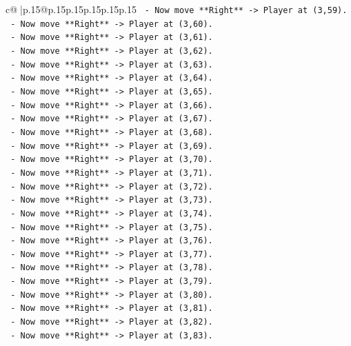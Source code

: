 \documentclass{article}
\begin{document}
{\begin{supertabular}{c@{$\;$}|p{.15\linewidth}@{}p{.15\linewidth}p{.15\linewidth}p{.15\linewidth}p{.15\linewidth}p{.15\linewidth}}
{{{\texttt{    {-}   Now move **Right** {-}> Player at (3,59).} \\
\texttt{    {-}   Now move **Right** {-}> Player at (3,60).} \\
\texttt{    {-}   Now move **Right** {-}> Player at (3,61).} \\
\texttt{    {-}   Now move **Right** {-}> Player at (3,62).} \\
\texttt{    {-}   Now move **Right** {-}> Player at (3,63).} \\
\texttt{    {-}   Now move **Right** {-}> Player at (3,64).} \\
\texttt{    {-}   Now move **Right** {-}> Player at (3,65).} \\
\texttt{    {-}   Now move **Right** {-}> Player at (3,66).} \\
\texttt{    {-}   Now move **Right** {-}> Player at (3,67).} \\
\texttt{    {-}   Now move **Right** {-}> Player at (3,68).} \\
\texttt{    {-}   Now move **Right** {-}> Player at (3,69).} \\
\texttt{    {-}   Now move **Right** {-}> Player at (3,70).} \\
\texttt{    {-}   Now move **Right** {-}> Player at (3,71).} \\
\texttt{    {-}   Now move **Right** {-}> Player at (3,72).} \\
\texttt{    {-}   Now move **Right** {-}> Player at (3,73).} \\
\texttt{    {-}   Now move **Right** {-}> Player at (3,74).} \\
\texttt{    {-}   Now move **Right** {-}> Player at (3,75).} \\
\texttt{    {-}   Now move **Right** {-}> Player at (3,76).} \\
\texttt{    {-}   Now move **Right** {-}> Player at (3,77).} \\
\texttt{    {-}   Now move **Right** {-}> Player at (3,78).} \\
\texttt{    {-}   Now move **Right** {-}> Player at (3,79).} \\
\texttt{    {-}   Now move **Right** {-}> Player at (3,80).} \\
\texttt{    {-}   Now move **Right** {-}> Player at (3,81).} \\
\texttt{    {-}   Now move **Right** {-}> Player at (3,82).} \\
\texttt{    {-}   Now move **Right** {-}> Player at (3,83).} \\
}}}
\end{supertabular}}
\end{document}
